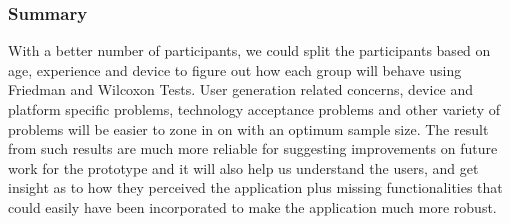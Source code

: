 \subsubsection{Summary}
With a better number of participants, we could split the participants based on age, experience and device to figure out how each group will behave using Friedman\cite{Friedman} and Wilcoxon\cite{Wilcoxon} Tests. User generation related concerns, device and platform specific problems, technology acceptance problems and other variety of problems will be easier to zone in on with an optimum sample size. The result from such results are much more reliable for suggesting improvements on future work for the prototype and it will also help us understand the users, and get insight as to how they perceived the application plus missing functionalities that could easily have been incorporated to make the application much more robust.
\newpage

